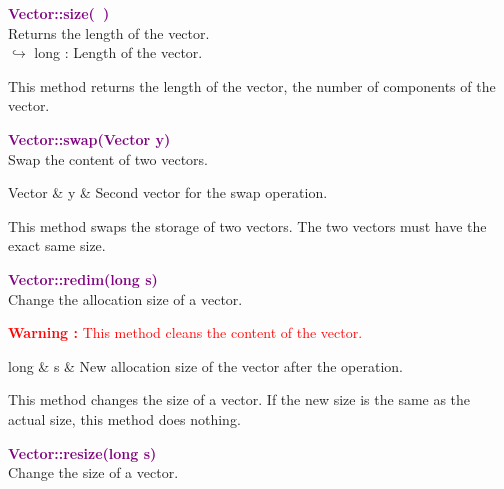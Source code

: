 \textcolor{purple}{\textbf{Vector::size(~)}}\label{Vector::size()}\\
Returns the length of the vector.\\ \hspace*{10mm}$\hookrightarrow$ long : Length of the vector.

This method returns the length of the vector, \ie the number of components of the vector.

\textcolor{purple}{\textbf{Vector::swap(Vector y)}}\label{Vector::swap(Vector y)}\\
Swap the content of two vectors.

\begin{tcolorbox}[width=\textwidth,myArgs,tabularx={ll|R}]
Vector & y & Second vector for the swap operation.
\end{tcolorbox}

This method swaps the storage of two vectors.
The two vectors must have the exact same size.

\textcolor{purple}{\textbf{Vector::redim(long s)}}\label{Vector::redim(long s)}\\
Change the allocation size of a vector.

\hspace*{10mm}\textcolor{red}{\textbf{Warning :} This method cleans the content of the vector.}

\begin{tcolorbox}[width=\textwidth,myArgs,tabularx={ll|R}]
long & s & New allocation size of the vector after the operation.
\end{tcolorbox}

This method changes the size of a vector.
If the new size is the same as the actual size, this method does nothing.

\textcolor{purple}{\textbf{Vector::resize(long s)}}\label{Vector::resize(long s)}\\
Change the size of a vector.

